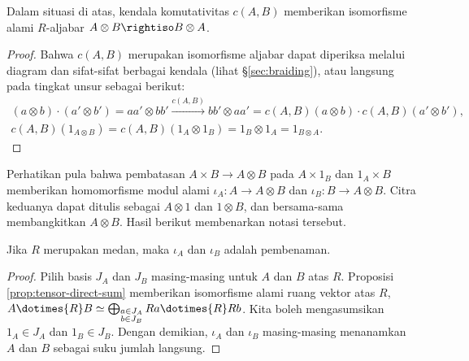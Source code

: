 \begin{lemma}\label{prop:algebra-otimes-comm}
	Dalam situasi di atas, kendala komutativitas $c(A, B)$ memberikan isomorfisme alami $R$-aljabar $A \otimes B \rightiso B \otimes A$.
\end{lemma}
\begin{proof}
	Bahwa $c(A, B)$ merupakan isomorfisme aljabar dapat diperiksa melalui diagram dan sifat-sifat berbagai kendala (lihat \S\ref{sec:braiding}), atau langsung pada tingkat unsur sebagai berikut:
	\begin{gather*}
	(a \otimes b) \cdot (a' \otimes b') = aa' \otimes bb' \xrightarrow{c(A, B)} bb' \otimes aa' = c(A,B)(a \otimes b) \cdot c(A,B)(a' \otimes b'), \\
	c(A,B)(1_{A \otimes B}) = c(A,B)(1_A \otimes 1_B) = 1_B \otimes 1_A = 1_{B \otimes A}.
	\end{gather*}
\end{proof}

Perhatikan pula bahwa pembatasan $A \times B \to A \otimes B$ pada $A \times {1_B}$ dan ${1_A} \times B$ memberikan homomorfisme modul alami $\iota_A: A \to A \otimes B$ dan $\iota_B: B \to A \otimes B$. Citra keduanya dapat ditulis sebagai $A \otimes 1$ dan $1 \otimes B$, dan bersama-sama membangkitkan $A \otimes B$. Hasil berikut membenarkan notasi tersebut.
\begin{lemma}
	Jika $R$ merupakan medan, maka $\iota_A$ dan $\iota_B$ adalah pembenaman.
\end{lemma}
\begin{proof}
	Pilih basis $J_A$ dan $J_B$ masing-masing untuk $A$ dan $B$ atas $R$. Proposisi \ref{prop:tensor-direct-sum} memberikan isomorfisme alami ruang vektor atas $R$, $A \dotimes{R} B \simeq \bigoplus_{\substack{a \in J_A \\ b \in J_B }} Ra \dotimes{R} Rb$. Kita boleh mengasumsikan $1_A \in J_A$ dan $1_B \in J_B$. Dengan demikian, $\iota_A$ dan $\iota_B$ masing-masing menanamkan $A$ dan $B$ sebagai suku jumlah langsung.
\end{proof}

